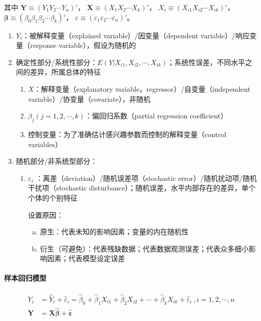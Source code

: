 \documentclass[12pt]{book}
\begin{document}
其中
$\bm{Y}\equiv (Y_{1} Y_{2} \cdots  Y_{n})'$，
$\bm{X}\equiv (X_{1} X_{2} \cdots X_{k})'$，
$X_{i}\equiv (X_{i1} X_{i2} ⋯ X_{ik})'$，
$\bm{\beta}\equiv (\beta_{0} \beta_{1} \beta_{2} \cdots \beta_{k})'$，
$\varepsilon \equiv (\varepsilon_{1} \varepsilon_{2} \cdots \varepsilon_{n})'$。

\begin{enumerate}[1.]
    \item $Y_i$：被解释变量（explained variable）/因变量（dependent variable）/响应变量（response variable），假设为随机的
    \item 确定性部分/系统性部分：$E(Y|X_{i1},X_{i2},\cdots,X_{ik})$；系统性误差，不同水平之间的差异，所属总体的特征
    \begin{enumerate}[(1)]
        \item $X$：解释变量（explanatory variable，regressor）/自变量（independent variable）/协变量（covariate），非随机
        \item $\beta_j(j=1,2,⋯,k)$：偏回归系数（partial regression coefficient） 
        \item 控制变量：为了准确估计感兴趣参数而控制的解释变量（control variables）
    \end{enumerate}
    \item 随机部分/非系统型部分：
    \begin{enumerate}[(1)]
        \item $\varepsilon_i$ ：离差（deviation）/随机误差项（stochastic error）/随机扰动项/随机干扰项（stochastic disturbance）；随机误差，水平内部存在的差异，单个个体的个别特征
        \par 设置原因：
    \begin{enumerate}[a.] 
        \item 原生：代表未知的影响因素；变量的内在随机性  
        \item 衍生（可避免）：代表残缺数据；代表数据观测误差；代表众多细小影响因素；代表模型设定误差
    \end{enumerate}
    \end{enumerate}
\end{enumerate}




\paragraph{样本回归模型}

\begin{align*}
Y_i & ={\hat{Y}}_i+{\hat{\varepsilon}}_i ={\hat{\beta}}_0+{\hat{\beta}}_1X_{i1}+{\hat{\beta}}_2X_{i2}+\cdots+{\hat{\beta}}_kX_{ik}+{\hat{\varepsilon}}_i\ , i=1,2,\cdots,n \\  
\mathbf{Y}&=\mathbf{X}\hat{\bm{\beta}}+\hat{\bm{\varepsilon}}
\end{align*}
\end{document}
